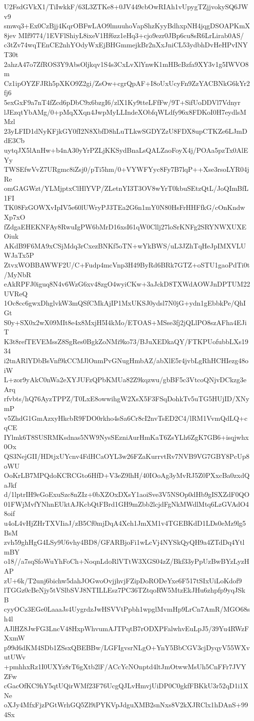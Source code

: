 U2FsdGVkX1/TiIwkkF/63L3ZTKe8+0JV449cbOwRIAh1vUpygTZjjvokySQ6JWv9
smwq3+Ex0CzBjj4KqrOBFwLAO9lmuuhoVapShzKyyBdhxpNH4jqgDSOAPKmX8jev
MIf9774/1EVFlShiyL8ixeV1Hf6zz1eHq3+cjo9ezr0JBp6cu8sR6LrLirab0AS/
c3tZv74wqTEnCE2nhYOdyWxEjBHGmmejkBr2nXxJniCL53ydbhDvHeHPvINYT30t
2ahzA47o7ZfROS3Y9AbsOljkqv1S4s3CxLvXlYnwK1mHBcBzfa9XY3v1g5IWVO8m
Cz1ipOYZFJRh5pXKO9Z2gi/ZsOw+cgrQpAF+I8oUxUcyFn9ZzYACBNkG6kYr2fj6
5exGxF9a7nT4fZcd6pDbC9x6bzgI6/zlX1Ky9tteLFfFw/9T+SifUoDDVl7Vdnyr
lJEzqtYbAMg/0+pMqXXqn4JwpMyLLIndeXObfqWLdfy96x8FDKoI0H7eydlsMMzl
23yLFID1dNyKFjkGY0fI2N8XbfD8hLuTLkwSGDYZzU8FDX8upCTKZe6LJmDdE3Cb
uytqJX5lAnHw+b4nA30yYrPZLjKKSydBnaLsQALZaoFoyX4j/POAa5pzTx0AlEYy
TWSEfwVvZ7URgmc8iZsj0/pTi5hm/0+VYWFYyc8Fy7B7lqP++Xse3rsoLYR04jRe
omGAGWzt/YLMjptxClHlYVP/ZLetnYI3T3OV8wYrT0kbuSEtzQtL/JoQImBfL1FI
TK08FzGOWXvIpIV5e60lUWryPJ3TEa2G6n1mY0N80HsFrHHFfkG/cOnKndwXp7xO
fZdgaEHEKNFAy8RwuIgPW6bMrD16xsI61qW0Cllj27loSrKNFg2SRYNWXUXEOiuk
AKdB9F6MA9xCSjMdq3rCxezBNKf5oTN+wYkBWS/uL3JZhTqHeJpIMXVLUWJaTx5P
ZtvxWOBBAWWF2U/C+Fudp4mcVnp3H49ByRd6BRk7GTZ+oSTU1gaoPdTi0t/MyNbR
eAkRPFJ0iguq8N4v6WzG6xv48zgO4wyiCKw+3aJckD8TXWdAOWJnDPTUM22UVReQ
1Oc8cc6gwxDhglvkW3mQSfCMkAjIP1MxUKSJ0ydsl7N0jG+ydn1gEbbkPe/QhIGt
S0y+SX0x2wX09MIt8e4x8MxjH5I4kMo/ETOAS+MSse3fj2jQLlPO8szAFha4EJiT
K3t8refTEVEMssZ8SgRes0BgkZoNMi9ko73/BJuXEDkaQY/FTKPUofubbLXs1934
i2tnARlYDbBsVnf9kCCMJlOnmPvGNugHmbAZ/abXlE5r4jvbLgRhHCHIezg48oiW
L+zor9yAkC0nWa2eXYJUFzQPbKMUa82Z9kqzwu/gbBF5c3VtcoQNjvDCkzg3eArq
rfvbts/hQ76AyzTPPZ/T0LxE8owwihgW2XsX5F3FSqDohkTv5uTG5HUjID/XNymP
v5ZhdG1GmAzxyHkcbR9FDO0rkho4sSa6Cr8cI2nvTsED2C4/lRM1VvmQdLQ+cqCE
IYlmk6T8SUSRMKsdnas5NW9NysSEzniAurHmKaT6ZsYLh6ZgK7GB6+isqjwhx0Ox
QS3NejGII/HDtjxUYcnv4FdHCaOYL3w26FZaKurrvtRv7NVB9VG7GBY8PcUp8oWU
OoKrLB7MPQdoKCRCGto6HfD+V3eZ9lhH/40IOoAg3yMvRJ5Z0PXxcBa0zxdQaJkf
d/1lptrIH9eGoExuSzc8nZIz+0bXZOxDXsY1aoiSve3V5NSOp0dHb9gISXZdF0QO
01FWjMvfYNhnEUktAJKcbQtFBrd1GH9mZbb2lcjdFgNkMWdlMtq6LzGVAdO48oif
u4oL4vHjZHrTXVIiaJ/zB5Cf0mjDqA4Xch1JmXM1v4TGEBKdD1LDs0eMz9lg5BsM
zvh59ghHgG4LSy9U6vhy4BD8/GFARBjoFi1wLcVj4NYSkQyQH9a4ZTdDq4YtlmBY
o18//a7sqSfoWuYhFoCh+NoqnLdoRlVTtW3XGS04zZ/Bkf33yPpUzBwBYzLyzHAP
zU+6k/T2unj6bichw5dahJOGwoOvjjhvjFZipDoRODeYxe6F517tSIxUiLoKdof9
lTGGz0cBeNjy5tVSlbSVJ8NTILLEsz7PC36TZtqoRW5MtzEkJHu6zhpfp9yqJSkB
cyyOCz3EGe0LaaaJs4UygrdzJwHSVVtPpbh1wpglMvmHp9LrCn7AmR/MGO68sh4l
AJlHZ8JwFG3LncV48HxpWhvumAJTPqtB7rODXPFalwhvEuLpJ5/39Yu4RWzFXxmW
p99d6dKM4SDb1ZSsxQBEBBw/LGFIgvsrNLgO+YnY5BbCGV3cjDyqyV55WXvutUWv
+pmhhxRz1I0UXYz8rT6gXtb2lF/ACcYcNOnptd4ltJmOtwwMsUh5CnFFr7JVYZFw
cGacOfKC9hY5qtUQirWMf23F76UcgQJLvHmvjUiDP0C0gkfFBKkU3r52qD1i1XNe
oXJy4MfxFjzPGtWrhGQ5Zl9iPYKVpJdguXMB2snNxs8V2kXJRClx1hDAnS+994Sx
